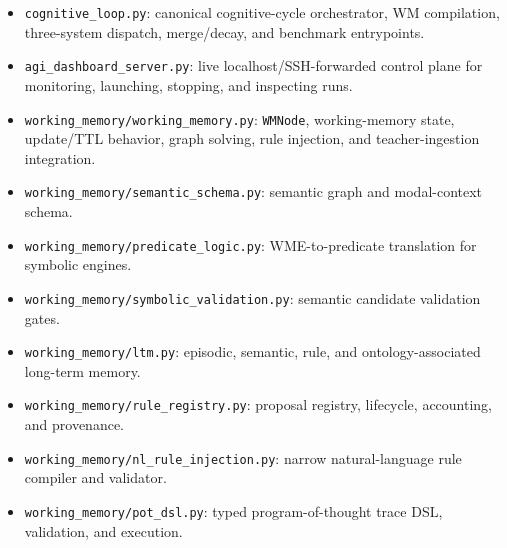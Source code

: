 \documentclass[14pt]{article}
\begin{document}
\begin{description}[style=nextline,leftmargin=1.5em]
  \item[Orchestration and control.]
    \begin{itemize}[leftmargin=1.5em]
      \item \texttt{cognitive\_loop.py}: canonical cognitive-cycle orchestrator,
            WM compilation, three-system dispatch, merge/decay, and benchmark
            entrypoints.
      \item \texttt{agi\_dashboard\_server.py}: live localhost/SSH-forwarded
            control plane for monitoring, launching, stopping, and inspecting runs.
    \end{itemize}

  \item[Working Memory, representation, and memory.]
    \begin{itemize}[leftmargin=1.5em]
      \item \texttt{working\_memory/working\_memory.py}: \texttt{WMNode},
            working-memory state, update/TTL behavior, graph solving, rule
            injection, and teacher-ingestion integration.
      \item \texttt{working\_memory/semantic\_schema.py}: semantic graph and
            modal-context schema.
      \item \texttt{working\_memory/predicate\_logic.py}: WME-to-predicate
            translation for symbolic engines.
      \item \texttt{working\_memory/symbolic\_validation.py}: semantic candidate
            validation gates.
      \item \texttt{working\_memory/ltm.py}: episodic, semantic, rule, and
            ontology-associated long-term memory.
      \item \texttt{working\_memory/rule\_registry.py}: proposal registry,
            lifecycle, accounting, and provenance.
      \item \texttt{working\_memory/nl\_rule\_injection.py}: narrow natural-language
            rule compiler and validator.
      \item \texttt{working\_memory/pot\_dsl.py}: typed program-of-thought
            trace DSL, validation, and execution.
    \end{itemize}


\end{description}
\end{document}
